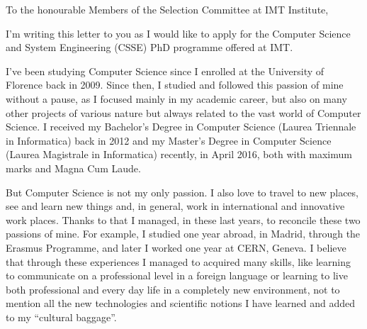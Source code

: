 \documentclass{article}
\begin{document}
    \hspace*{0.5\linewidth}
    
    To the honourable Members of the Selection Committee at IMT Institute, \par \bigskip
    
    I'm writing this letter to you as I would like to apply for the Computer Science and System
    Engineering (CSSE) PhD programme offered at IMT. \par \bigskip
    
    I've been studying Computer Science since I enrolled at the University of Florence back in 2009. Since then, I studied and followed this passion of mine without a pause, as I focused mainly in my academic career, but also on many other projects of various nature but always related to the vast world of Computer Science. I received my Bachelor's Degree in Computer Science (Laurea Triennale in Informatica) back in 2012 and my Master's Degree in Computer Science (Laurea Magistrale in Informatica) recently, in April 2016, both with maximum marks and Magna Cum Laude. \par \bigskip
    
    But Computer Science is not my only passion. I also love to travel to new places, see and learn new things and, in general, work in international and innovative work places. Thanks to that I managed, in these last years, to reconcile these two passions of mine. For example, I studied one year abroad, in Madrid, through the Erasmus Programme, and later I worked one year at CERN, Geneva. I believe that through these experiences I managed to acquired many skills, like learning to communicate on a professional level in a foreign language or learning to live both professional and every day life in a completely new environment, not to mention all the new technologies and scientific notions I have learned and added to my ``cultural baggage''. \par \bigskip
    
\end{document}
